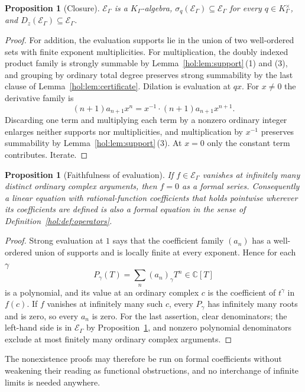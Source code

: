 \documentclass[11pt]{article}
\numberwithin{equation}{section}
\newtheorem{proposition}[theorem]{Proposition}
\theoremstyle{definition}
\theoremstyle{remark}
\newcommand{\C}{\mathbb C}
\newcommand{\K}{K_\Gamma}
\newcommand{\E}{\mathcal E_\Gamma}
\begin{document}
\begin{proposition}[Closure]\label{hol:prop:closure}
$\E$ is a $\K$-algebra, $\sigma_q(\E)\subseteq\E$ for every $q\in\K^\times$,
and $D_z(\E)\subseteq\E$.
\end{proposition}

\begin{proof}
For addition, the evaluation supports lie in the union of two well-ordered
sets with finite exponent multiplicities. For multiplication, the doubly
indexed product family is strongly summable by
Lemma~\ref{hol:lem:support}\,(1) and (3), and grouping by ordinary total
degree preserves strong summability by the last clause of
Lemma~\ref{hol:lem:certificate}. Dilation is evaluation at $qx$. For $x\ne0$
the derivative family is
\[
 (n+1)a_{n+1}x^n=x^{-1}\cdot(n+1)a_{n+1}x^{n+1}.
\]
Discarding one term and multiplying each term by a nonzero ordinary integer
enlarges neither supports nor multiplicities, and multiplication by $x^{-1}$
preserves summability by Lemma~\ref{hol:lem:support}\,(3). At $x=0$ only the
constant term contributes. Iterate.
\end{proof}

\begin{proposition}[Faithfulness of evaluation]\label{hol:prop:faithful}
If $f\in\E$ vanishes at infinitely many distinct ordinary complex arguments,
then $f=0$ as a formal series. Consequently a linear equation with
rational-function coefficients that holds pointwise wherever its coefficients
are defined is also a formal equation in the sense of
Definition~\ref{hol:def:operators}.
\end{proposition}

\begin{proof}
Strong evaluation at $1$ says that the coefficient family $(a_n)$ has a
well-ordered union of supports and is locally finite at every exponent. Hence
for each $\gamma$
\[
 P_\gamma(T)=\sum_n(a_n)_\gamma T^n\in\C[T]
\]
is a polynomial, and its value at an ordinary complex $c$ is the coefficient
of $t^\gamma$ in $f(c)$. If $f$ vanishes at infinitely many such $c$, every
$P_\gamma$ has infinitely many roots and is zero, so every $a_n$ is zero. For
the last assertion, clear denominators; the left-hand side is in $\E$ by
Proposition~\ref{hol:prop:closure}, and nonzero polynomial denominators
exclude at most finitely many ordinary complex arguments.
\end{proof}

The nonexistence proofs may therefore be run on formal coefficients without
weakening their reading as functional obstructions, and no interchange of
infinite limits is needed anywhere.
\end{document}
